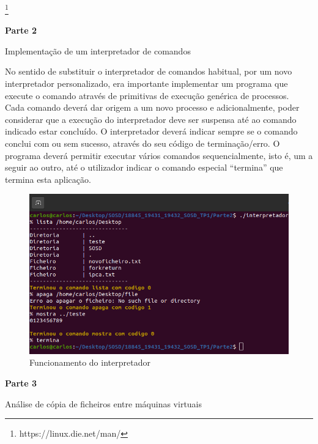\documentclass{article}
\begin{document}
	\footnote[1]{https://linux.die.net/man/}
	
	\newpage
	
	
	\centerline{\textbf{Parte 2}}
	\vspace*{1 em}
	\centerline{Implementação de um interpretador de comandos}
	\vspace{3 em}
	
	No sentido de substituir o interpretador de comandos habitual, por um novo interpretador personalizado, era importante implementar um programa que execute o comando através de primitivas de execução genérica de processos. \\
	Cada comando deverá dar origem a um novo processo e adicionalmente, poder considerar que a execução do interpretador deve ser suspensa até ao comando indicado estar concluído. O interpretador deverá indicar sempre se o comando conclui com ou sem sucesso, através do seu código de terminação/erro. O programa deverá permitir executar vários comandos sequencialmente, isto é, um a seguir ao outro, até	o utilizador indicar o comando especial “termina” que termina esta aplicação.
	
	\vspace*{4 em}
	\begin{figure}[!htb]
		\centering
		\includegraphics[scale=0.7]{interpretador_parte2}
		\caption{Funcionamento do interpretador}
	\end{figure}
	\newpage
	
	\centerline{\textbf{Parte 3}}
	\vspace{1 em}
	\centerline{Análise de cópia de ficheiros entre máquinas virtuais}
	\vspace{3 em}
	
\end{document}
